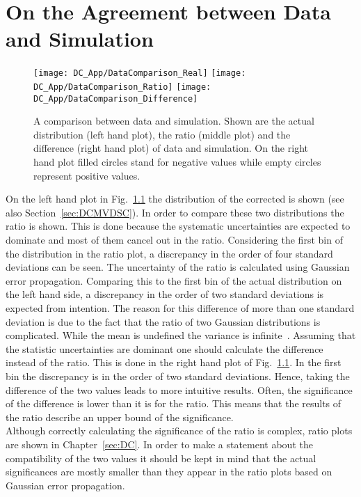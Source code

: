 \chapter{On the Agreement between Data and Simulation \label{sec:DCPvalue}}

\begin{figure}[!h]
  \centering
  \texttt{[image: DC\_App/DataComparison\_Real]}
  \texttt{[image: DC\_App/DataComparison\_Ratio]}
  \texttt{[image: DC\_App/DataComparison\_Difference]}
\caption[Comparison between data and simulation: Actual distributions, ratio and difference]{A comparison between data and simulation. Shown are the actual distribution (left hand plot), the ratio (middle plot) and the difference (right hand plot) of data and simulation. On the right hand plot filled circles stand for negative values while empty circles represent positive values. \label{plot:DCPvalue}}
\end{figure}

On the left hand plot in Fig.~\ref{plot:DCPvalue} the distribution of the corrected \MET{} is shown (see also Section~\ref{sec:DCMVDSC}). In order to compare these two distributions the ratio is shown. This is done because the systematic uncertainties are expected to dominate and most of them cancel out in the ratio. Considering the first bin of the distribution in the ratio plot, a discrepancy in the order of four standard deviations can be seen. The uncertainty of the ratio is calculated using Gaussian error propagation. Comparing this to the first bin of the actual distribution on the left hand side, a discrepancy in the order of two standard deviations is expected from intention. The reason for this difference of more than one standard deviation is due to the fact that the ratio of two Gaussian distributions is complicated. While the mean is undefined the variance is infinite~\cite{ratioMail}. Assuming that the statistic uncertainties are dominant one should calculate the difference instead of the ratio. This is done in the right hand plot of Fig.~\ref{plot:DCPvalue}. In the first bin the discrepancy is in the order of two standard deviations. Hence, taking the difference of the two values leads to more intuitive results. Often, the significance of the difference is lower than it is for the ratio. This means that the results of the ratio describe an upper bound of the significance. \\
Although correctly calculating the significance of the ratio is complex, ratio plots are shown in Chapter~\ref{sec:DC}. In order to make a statement about the compatibility of the two values it should be kept in mind that the actual significances are mostly smaller than they appear in the ratio plots based on Gaussian error propagation.
